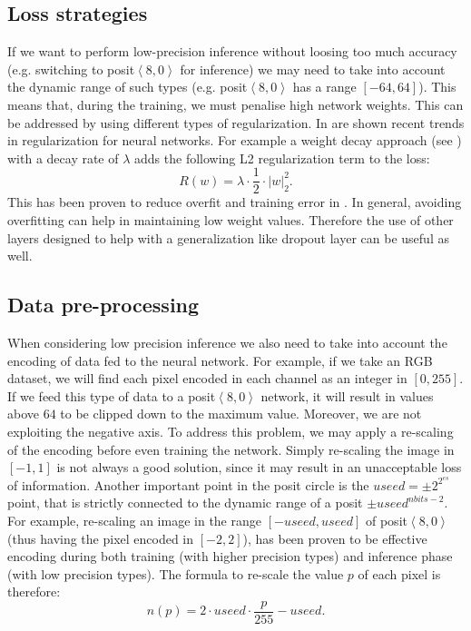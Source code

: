 \subsection{Loss strategies} If we want to perform low-precision inference without loosing too much accuracy (e.g. switching to posit$\left <8,0\right>$ for inference) we may need to take into account the dynamic range of such types (e.g. posit$\left <8,0\right>$ has a range $[-64,64]$). This means that, during the training, we must penalise high network weights. This can be addressed by using different types of regularization. In \cite{kukaka2017regularization}  are shown recent trends in regularization for neural networks. For example a weight decay approach (see \cite{plaut1986experiments}) with a decay rate of $\lambda$ adds the following L2 regularization term to the loss: \[R(w) = \lambda \cdot \frac{1}{2} \cdot \left | w \right |^2_2 . \] This has been proven to reduce overfit and training error in \cite{Krizhevsky:2017:ICD:3098997.3065386}. In general, avoiding overfitting can help in maintaining low weight values. Therefore the use of other layers designed to help with a generalization like dropout layer \cite{JMLR:v15:srivastava14a} can be useful as well.


\subsection{Data pre-processing} When considering low precision inference we also need to take into account the encoding of data fed to the neural network. For example, if we take an RGB dataset, we will find each pixel encoded in each channel as an integer in $[0,255]$. If we feed this type of data to a posit$\left <8,0\right>$ network, it will result in values above $64$ to be clipped down to the maximum value. Moreover, we are not exploiting the negative axis. To address this problem, we may apply a re-scaling of the encoding before even training the network. Simply re-scaling the image in $[-1,1]$ is not always a good solution, since it may result in an unacceptable loss of information. Another important point in the posit circle is the $useed = \pm 2^{2^{es}}$ point, that is strictly connected to the dynamic range of a posit $\pm useed^{nbits-2}$. For example, re-scaling an image in the range $[-useed,useed]$ of posit$\left <8,0\right>$ (thus having the pixel encoded in $[-2,2]$), has been proven to be effective encoding during both training (with higher precision types) and inference phase (with low precision types). The formula to re-scale the value $p$ of each pixel is therefore: \[ n(p) = 2\cdot useed \cdot \frac{p}{255} - useed. \]

